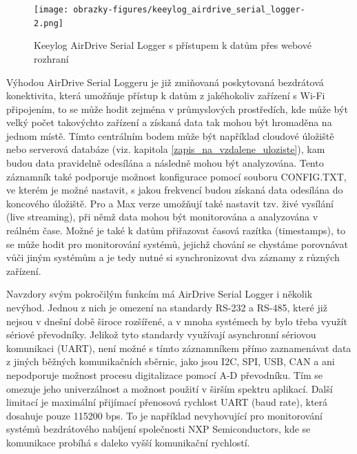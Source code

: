 \begin{figure}[h]
    \centering
    \texttt{[image: obrazky-figures/keeylog\_airdrive\_serial\_logger-2.png]}
    
    \caption{Keeylog AirDrive Serial Logger s přístupem k datům přes webové rozhraní \cite{keelog_airdrive_serial_datalogger, keelog_airdrive_serial_datalogger_scheme}}
    \label{fig:keelog-airdrive-serial-datalogger}
\end{figure}

Výhodou AirDrive Serial Loggeru je již zmiňovaná poskytovaná bezdrátová konektivita, která umožňuje přístup k datům z jakéhokoliv zařízení s Wi-Fi připojením, to se může hodit zejména v průmyslových  prostředích, kde může být velký počet takovýchto zařízení a získaná data tak mohou být hromaděna na jednom místě. Tímto centrálním bodem může být například cloudové úložiště nebo serverová databáze (viz. kapitola \ref{zapis_na_vzdalene_uloziste}), kam budou data pravidelně odesílána a následně mohou být analyzována. Tento záznamník také podporuje možnost konfigurace pomocí souboru CONFIG.TXT, ve kterém je možné nastavit, s jakou frekvencí budou získaná data odesílána do koncového úložiště. Pro a Max verze umožňují také nastavit tzv. živé vysílání (live streaming), při němž data mohou být monitorována a analyzována v reálném čase. Možné je také k datům přiřazovat časová razítka (timestamps), to se může hodit pro monitorování systémů, jejichž chování se chystáme porovnávat vůči jiným systémům a je tedy nutné si synchronizovat dva záznamy z různých zařízení. \cite{keelog_airdrive_serial_datalogger}

Navzdory svým pokročilým funkcím má AirDrive Serial Logger i několik nevýhod. Jednou z nich je omezení na standardy RS-232 a RS-485, které již nejsou v dnešní době široce rozšířené, a v mnoha systémech by bylo třeba využít sériové převodníky. Jelikož tyto standardy využívají asynchronní sériovou komunikaci (UART), není možné s tímto záznamníkem přímo zaznamenávat data z jiných běžných komunikačních sběrnic, jako jsou I2C, SPI, USB, CAN a ani nepodporuje možnost procesu digitalizace pomocí A-D převodníku. Tím se omezuje jeho univerzálnost a možnost použití v širším spektru aplikací. Další limitací je maximální přijímací přenosová rychlost UART (baud rate), která dosahuje pouze 115200 bps. To je například nevyhovující pro monitorování systémů bezdrátového nabíjení společnosti NXP Semiconductors, kde se komunikace probíhá s daleko vyšší komunikační rychlostí. \cite{keelog_airdrive_serial_datalogger}

